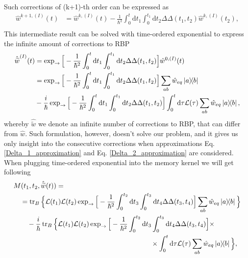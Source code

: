 Such corrections of (k+1)-th order can be expressed as 
\begin{equation}
\label{ansatz_RBP_iterative_Delta_without_k_general}
    \begin{aligned}
    \hat{w}^{k+1,(I)}(t) &= \hat{w}^{k, (I)}(t) - \frac{1}{\hbar^2} \int_{0}^{t} \mathrm{d} t_1 \int_{0}^{t_1} \mathrm{d} t_2 \Delta\Delta(t_1, t_2) \hat{w}^{k, (I)}(t_2), \\
    \end{aligned}
\end{equation}
This intermediate result can be solved with time-ordered exponential to express the infinite amount of corrections to RBP
\begin{equation}
\label{ansatz_RBP_iterative_Delta_without_k_general}
    \begin{aligned}
    \hat{\widetilde{w}}^{(I)}(t) &= \exp_{\rightarrow} \Big[ - \frac{1}{\hbar^2} \int_{0}^{t} \mathrm{d} t_1 \int_{0}^{t_1} \mathrm{d} t_2 \Delta\Delta(t_1, t_2)  \Big] \hat{w}^{0, (I)}(t) \\
    &= \exp_{\rightarrow} \Big[ - \frac{1}{\hbar^2} \int_{0}^{t} \mathrm{d} t_1 \int_{0}^{t_1} \mathrm{d} t_2 \Delta\Delta(t_1, t_2)  \Big] \sum_{ab} \hat{w}_{eq} \ketbra{a}{b}  \\
    &- \frac{i}{\hbar}\exp_{\rightarrow} \Big[ - \frac{1}{\hbar^2} \int_{0}^{t} \mathrm{d} t_1 \int_{0}^{t_1} \mathrm{d} t_2 \Delta\Delta(t_1, t_2)  \Big]  \int_{0}^{t} \mathrm{d} \tau \mathcal{L}(\tau) \sum_{ab} \hat{w}_{eq} \ketbra{a}{b}, \\
    \end{aligned}
\end{equation}
whereby $\hat{\widetilde{w}}$ we denote an infinite number of corrections to RBP, that can differ from $\hat{w}$. Such formulation, however, doesn't solve our problem, and it gives us only insight into the consecutive corrections when approximations Eq. \ref{Delta_1_approximation} and Eq. \ref{Delta_2_approximation} are considered. When plugging time-ordered exponential into the memory kernel we will get following 
\begin{equation}
\label{MK_exp_Delta}
    \begin{aligned}
    &M(t_1, t_2, \hat{\widetilde{w}}(t)) = \\
    &\quad = \operatorname{tr}_B \Big\{ \mathcal{L}(t_1) \mathcal{L}(t_2) \exp_{\rightarrow} \Big[ - \frac{1}{\hbar^2} \int_{0}^{t_2} \mathrm{d} t_3 \int_{0}^{t_3} \mathrm{d} t_4 \Delta\Delta(t_3, t_4)  \Big] \sum_{ab} \hat{w}_{eq} \ketbra{a}{b} \Big\} \\
    &\quad \quad  - \frac{i}{\hbar}\operatorname{tr}_B \Big\{ \mathcal{L}(t_1) \mathcal{L}(t_2) \exp_{\rightarrow} \Big[ - \frac{1}{\hbar^2} \int_{0}^{t_2} \mathrm{d} t_3 \int_{0}^{t_3} \mathrm{d} t_4 \Delta\Delta(t_3, t_4)  \Big] \times \\
    & \quad \quad \quad \quad \quad \quad \quad \quad \quad \quad \quad \quad \quad \quad \quad \quad \quad \quad \quad \quad \times \int_{0}^{t} \mathrm{d} \tau \mathcal{L}(\tau) \sum_{ab} \hat{w}_{eq} \ketbra{a}{b} \Big\}, \\
    \end{aligned}
\end{equation}
